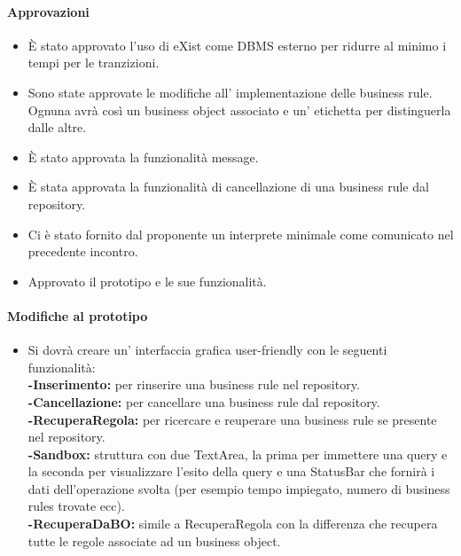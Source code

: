 \documentclass[11pt,titlepage,a4paper]{report}
\begin{document}
\paragraph{Approvazioni}
\begin{itemize}
\item \`E stato approvato l'uso di eXist come DBMS esterno per ridurre al minimo i tempi per le tranzizioni.
\item Sono state approvate le modifiche all' implementazione delle business rule. Ognuna avr\`a cos\`i un business object associato e un' etichetta per distinguerla dalle altre.
\item \`E stato approvata la funzionalit\`a message.
\item \`E stata approvata la funzionalit\`a di cancellazione di una business rule dal repository.
\item Ci \`e stato fornito dal proponente un interprete minimale come comunicato nel precedente incontro.
\item Approvato il prototipo e le sue funzionalit\`a.
\end{itemize}

\paragraph{Modifiche al prototipo}
\begin{itemize}
\item Si dovr\`a creare un' interfaccia grafica user-friendly con le seguenti funzionalit\`a:\\
\textbf{-Inserimento:} per rinserire una business rule nel repository.\\
\textbf{-Cancellazione:} per cancellare una business rule dal repository.\\
\textbf{-RecuperaRegola:} per ricercare e reuperare una business rule se presente nel repository.\\
\textbf{-Sandbox: }struttura con due TextArea, la prima per immettere una query e la seconda per visualizzare l'esito della query e una StatusBar che fornir\`a i dati dell'operazione svolta (per esempio tempo impiegato, numero di business rules trovate ecc).\\
\textbf{-RecuperaDaBO: }simile a RecuperaRegola con la differenza che recupera tutte le regole associate ad un business object.\\
\end{itemize}
\end{document}
